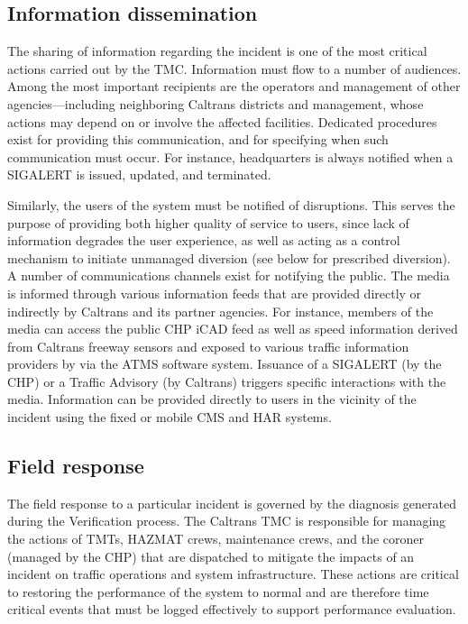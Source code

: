 \documentclass[12pt]{report}
\newcounter{time}
\begin{document}
\subsection{Information dissemination}
\label{sec:inf-dis}

The sharing of information regarding the incident is one of the most critical
actions carried out by the \ac{TMC}.  Information must flow to a number of
audiences.  Among the most important recipients are the operators and management
of other agencies---including neighboring Caltrans districts and management,
whose actions may depend on or involve the affected facilities.  Dedicated
procedures exist for providing this communication, and for specifying when such
communication must occur.  For instance, headquarters is always notified when a
SIGALERT is issued, updated, and terminated.

Similarly, the users of the system must be notified of disruptions.  This serves
the purpose of providing both higher quality of service to users, since lack of
information degrades the user experience, as well as acting as a control
mechanism to initiate unmanaged diversion (see below for prescribed diversion).
A number of communications channels exist for notifying the public.  The media
is informed through various information feeds that are provided directly or
indirectly by Caltrans and its partner agencies.  For instance, members of the
media can access the public \ac{CHP} \ac{iCAD} feed as well as speed information
derived from Caltrans freeway sensors and exposed to various traffic information
providers by via the \ac{ATMS} software system.  Issuance of a SIGALERT (by the
\ac{CHP}) or a Traffic Advisory (by Caltrans) triggers specific interactions
with the media.  Information can be provided directly to users in the vicinity
of the incident using the fixed or mobile \ac{CMS} and \ac{HAR} systems.

\subsection{Field response}
\label{sec:field-response}

The field response to a particular incident is governed by the diagnosis
generated during the {\sc Verification} process.  The Caltrans \ac{TMC} is
responsible for managing the actions of \acp{TMT}, \ac{HAZMAT} crews,
maintenance crews, and the coroner (managed by the \ac{CHP}) that are dispatched
to mitigate the impacts of an incident on traffic operations and system
infrastructure.  These actions are critical to restoring the performance of the
system to normal and are therefore time critical events that must be logged
effectively to support performance evaluation.
\end{document}
